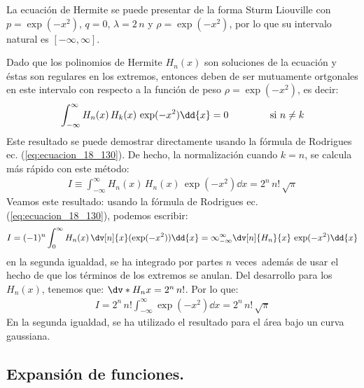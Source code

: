 La ecuación de Hermite se puede presentar de la forma Sturm Liouville con $p = \exp(-x^{2})$, $q = 0$, $\lambda = 2 \, n$ y $\rho = \exp(-x^{2})$, por lo que su intervalo natural es $[-\infty, \infty]$.
\par
Dado que los polinomios de Hermite $H_{n}(x)$ son soluciones de la ecuación y éstas son regulares en los extremos, entonces deben de ser mutuamente ortgonales en este intervalo con respecto a la función de peso $\rho = \exp(-x^{2})$, es decir:
\begin{align*}
\int_{-\infty}^{\infty} H_{n} (x) \, H_{k} (x) \, \exp(-x^{2}) \dd{x} = 0 \hspace{1.5cm} \mbox{si } n \neq k
\end{align*}
Este resultado se puede demostrar directamente usando la fórmula de Rodrigues ec. (\ref{eq:ecuacion_18_130}). De hecho, la normalización cuando $k = n$, se calcula más rápido con este método:
\begin{align}
I \equiv \int_{-\infty}^{\infty} H_{n}(x) \, H_{n}(x) \, \exp( -x^{2}) \dd{x} = 2^{n} \, n! \, \sqrt{\pi}
\label{eq:ecuacion_18_132}
\end{align}
Veamos este resultado: usando la fórmula de Rodrigues ec. (\ref{eq:ecuacion_18_130}), podemos escribir:
\begin{align*}
I = (-1)^{n} \int_{0}^{\infty} H_{n}(x) \, \dv[n]{x} (\exp(-x^{2})) \dd{x} = \infty_{-\infty}^{\infty} \dv[n]{H_{n}}{x} \, \exp(-x^{2}) \dd{x}
\end{align*}
en la segunda igualdad, se ha integrado por partes $n$ veces además de usar el hecho de que los términos de los extremos se anulan. Del desarrollo para los $H_{n}(x)$, tenemos que: $\dv*{H_{n}}{x} = 2^{n} \, n!$. Por lo que:
\begin{align*}
I = 2^{n} \, n! \int_{-\infty}^{\infty} \exp(-x^{2}) \dd{x} = 2^{n} \, n! \, \sqrt{\pi}
\end{align*}
En la segunda igualdad, se ha utilizado el resultado para el área bajo un curva gaussiana.

\subsection{Expansión de funciones.}

